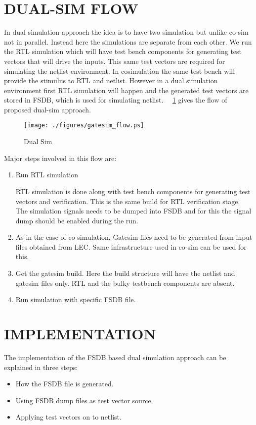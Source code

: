 \section {DUAL-SIM FLOW}
In dual simulation approach the idea is to have two simulation but unlike co-sim not in parallel.  Instead here the simulations are separate from each other. We run the RTL simulation which will have test bench components for generating test vectors that will drive the inputs. This same test vectors are required for simulating the netlist environment. In cosimulation the same test bench will provide the stimulus to RTL and netlist. However in a dual simulation environment first RTL simulation will happen and the generated test vectors are stored in FSDB, which is used for simulating netlist. ~\figurename{~\ref{fig:gatesim_flow.ps}} gives the flow of proposed dual-sim approach.  
\begin{figure}[H]
\centering
\texttt{[image: ./figures/gatesim\_flow.ps]}
\caption{Dual Sim}
\label{fig:gatesim_flow.ps}
\end{figure}

Major steps involved in this flow are:

\begin{enumerate}
	\item Run RTL simulation

	RTL simulation is done along with test bench components for generating test vectors and verification. This is the same build for RTL verification stage. The simulation signals needs to be dumped into FSDB and for this the signal dump should be enabled during the run.
	\item As in the case of co simulation, Gatesim files need to be generated from input files obtained from LEC. Same infrastructure used in co-sim can be used for this.
	\item Get the gatesim build. Here the build structure will have the netlist and gatesim files only. RTL and the bulky testbench components are absent.
	\item Run simulation with specific FSDB file.
\end{enumerate}


\section{IMPLEMENTATION}
The implementation of the FSDB based dual simulation approach can be explained in three steps:
\begin{itemize}
\item How the FSDB file is generated.
\item Using FSDB dump files as test vector source.
\item Applying test vectors on to netlist.
\end{itemize}

